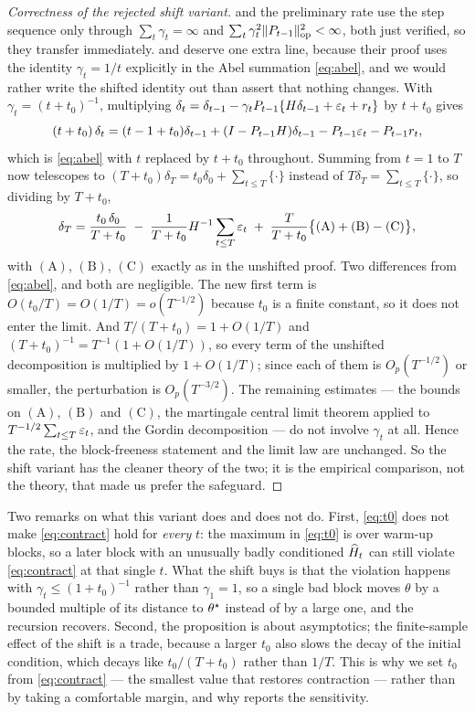 \begin{proof}[Correctness of the rejected shift variant]
 and the preliminary rate use the step sequence only through
$\sum_t\gamma_t=\infty$ and $\sum_t\gamma_t^2\lVert P_{t-1} \rVert_{\mathrm{op}}^2<\infty$, both just verified, so
they transfer immediately.  and  deserve one extra
line, because their proof uses the identity $\gamma_t=1/t$ explicitly in the Abel summation
\eqref{eq:abel}, and we would rather write the shifted identity out than assert that nothing
changes. With $\gamma_t=(t+t_0)^{-1}$, multiplying
$\delta_t=\delta_{t-1}-\gamma_tP_{t-1}\{H\delta_{t-1}+\varepsilon_t+r_t\}$ by $t+t_0$ gives
\begin{equation}
(t+t_0)\,\delta_t=(t-1+t_0)\delta_{t-1}+(I-P_{t-1}H)\delta_{t-1}-P_{t-1}\varepsilon_t-P_{t-1}r_t ,
\label{eq:abelshift}
\end{equation}
which is \eqref{eq:abel} with $t$ replaced by $t+t_0$ throughout. Summing from $t=1$ to $T$ now
telescopes to $(T+t_0)\delta_T=t_0\delta_0+\sum_{t\le T}\{\cdot\}$ instead of
$T\delta_T=\sum_{t\le T}\{\cdot\}$, so dividing by $T+t_0$,
\[
\delta_T=\frac{t_0\,\delta_0}{T+t_0}
\;-\;\frac{1}{T+t_0}H^{-1}\sum_{t\le T}\varepsilon_t
\;+\;\frac{T}{T+t_0}\big\{(\mathrm A)+(\mathrm B)-(\mathrm C)\big\},
\]
with $(\mathrm A)$, $(\mathrm B)$, $(\mathrm C)$ exactly as in the unshifted proof. Two
differences from \eqref{eq:abel}, and both are negligible. The new first term is
$O(t_0/T)=O(1/T)=o(T^{-1/2})$ because $t_0$ is a finite constant, so it does not enter the
limit. And $T/(T+t_0)=1+O(1/T)$ and $(T+t_0)^{-1}=T^{-1}(1+O(1/T))$, so every term of the
unshifted decomposition is multiplied by $1+O(1/T)$; since each of them is $O_p(T^{-1/2})$ or
smaller, the perturbation is $O_p(T^{-3/2})$. The remaining estimates --- the bounds on
$(\mathrm A)$, $(\mathrm B)$ and $(\mathrm C)$, the martingale central limit theorem applied to
$T^{-1/2}\sum_{t\le T}\varepsilon_t$, and the Gordin decomposition --- do not involve $\gamma_t$ at
all. Hence the rate, the block-freeness statement and the limit law are unchanged. So the shift
variant has the cleaner theory of the two; it is the empirical comparison, not the theory, that
made us prefer the safeguard.
\end{proof}

\noindent
Two remarks on what this variant does and does not do. First, \eqref{eq:t0} does not make
\eqref{eq:contract} hold for \emph{every} $t$: the maximum in \eqref{eq:t0}
is over warm-up blocks, so a later block with an unusually badly conditioned $\widehat H_t$ can still
violate \eqref{eq:contract} at that single $t$. What the shift buys is that the violation
happens with $\gamma_t\le(1+t_0)^{-1}$ rather than $\gamma_1=1$, so a single bad block moves
$\theta$ by a bounded multiple of its distance to $\theta^\star$ instead of by a large one, and the
recursion recovers. Second, the proposition is about asymptotics; the finite-sample effect of
the shift is a trade, because a larger $t_0$ also slows the decay of the initial condition,
which decays like $t_0/(T+t_0)$ rather than $1/T$. This is why we set $t_0$ from
\eqref{eq:contract} --- the smallest value that restores contraction --- rather than by taking a
comfortable margin, and why  reports the sensitivity.

